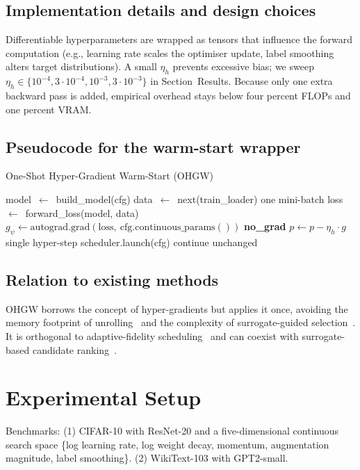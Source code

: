 \documentclass{article}
\begin{document}
\subsection{Implementation details and design choices}
Differentiable hyperparameters are wrapped as tensors that influence the forward computation (e.g., learning rate scales the optimiser update, label smoothing alters target distributions). A small \(\eta_h\) prevents excessive bias; we sweep \(\eta_h\in\{10^{-4}, 3\cdot 10^{-4}, 10^{-3}, 3\cdot 10^{-3}\}\) in Section~Results. Because only one extra backward pass is added, empirical overhead stays below four percent FLOPs and one percent VRAM\@.

\subsection{Pseudocode for the warm-start wrapper}
\begin{algorithm}[H]
\caption{One-Shot Hyper-Gradient Warm-Start (OHGW)}
\begin{algorithmic}[1]
    \State model~$\leftarrow$~build\_model(cfg)
    \State data~$\leftarrow$~next(train\_loader) \hfill one mini-batch
    \State loss~$\leftarrow$~forward\_loss(model, data)
    \State $g_\psi \leftarrow \mathrm{autograd.grad}(\text{loss},\ \text{cfg.continuous\_params}())$
    \State \textbf{no\_grad}
        \State $p \leftarrow p - \eta_h \cdot g$ \hfill single hyper-step
    \EndFor
    \State scheduler.launch(cfg) \hfill continue unchanged
  \EndFor
\end{algorithmic}
\end{algorithm}

\subsection{Relation to existing methods}
OHGW borrows the concept of hyper-gradients but applies it once, avoiding the memory footprint of unrolling~\cite{bertrand-2020-implicit} and the complexity of surrogate-guided selection~\cite{nguyen-2019-bayesian}. It is orthogonal to adaptive-fidelity scheduling~\cite{jiang-2024-efficient} and can coexist with surrogate-based candidate ranking~\cite{khazi-2023-deep}.

\section{Experimental Setup}
Benchmarks: (1) CIFAR-10 with ResNet-20 and a five-dimensional continuous search space \{log learning rate, log weight decay, momentum, augmentation magnitude, label smoothing\}. (2) WikiText-103 with GPT2-small.
\end{document}
